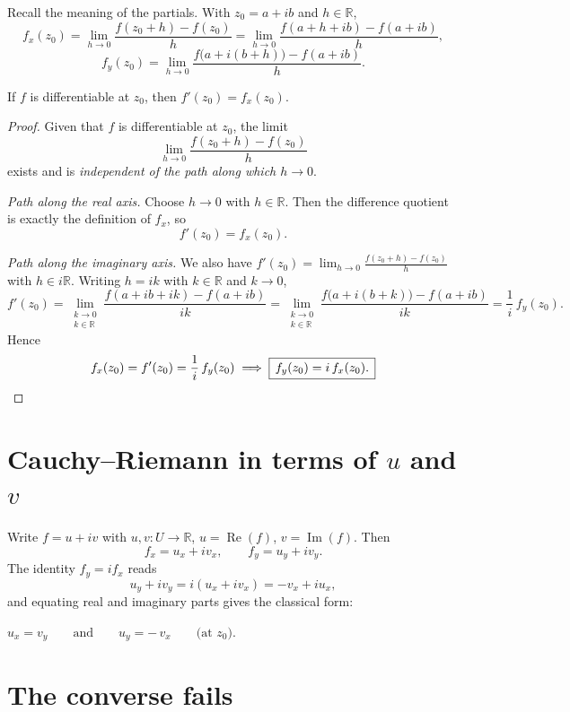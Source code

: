 \documentclass[11pt,openany]{report}
\newcommand{\R}{\mathbb{R}}
\renewcommand{\Re}{\operatorname{Re}}
\renewcommand{\Im}{\operatorname{Im}}
\begin{document}
Recall the meaning of the partials. With $z_0=a+ib$ and $h\in\R$,
\[
  f_x(z_0) = \lim_{h\to0}\frac{f(z_0+h)-f(z_0)}{h}
           = \lim_{h\to0}\frac{f(a+h+ib)-f(a+ib)}{h},
\]
\[
  f_y(z_0) = \lim_{h\to0}\frac{f\bigl(a+i(b+h)\bigr)-f(a+ib)}{h}.
\]

\begin{remark}
If $f$ is differentiable at $z_0$, then $f'(z_0)=f_x(z_0)$.
\end{remark}

\begin{proof}
Given that $f$ is differentiable at $z_0$, the limit
\[
  \lim_{h\to0}\frac{f(z_0+h)-f(z_0)}{h}
\]
exists and is \emph{independent of the path along which $h\to0$}.

\emph{Path along the real axis.} Choose $h\to0$ with $h\in\R$. Then the difference
quotient is exactly the definition of $f_x$, so
\[
  f'(z_0) = f_x(z_0).
\]

\emph{Path along the imaginary axis.} We also have
$f'(z_0)=\lim_{h\to0}\frac{f(z_0+h)-f(z_0)}{h}$ with $h\in i\R$. Writing $h=ik$ with
$k\in\R$ and $k\to0$,
\[
  f'(z_0) = \lim_{\substack{k\to0\\ k\in\R}} \frac{f(a+ib+ik)-f(a+ib)}{ik}
          = \lim_{\substack{k\to0\\ k\in\R}} \frac{f\bigl(a+i(b+k)\bigr)-f(a+ib)}{ik}
          = \frac1i\,f_y(z_0).
\]
Hence
\[
  f_x(z_0) = f'(z_0) = \frac1i\,f_y(z_0)
  \;\Longrightarrow\; \boxed{\,f_y(z_0) = i\,f_x(z_0).\,}\qedhere
\]
\end{proof}

\section{Cauchy--Riemann in terms of \texorpdfstring{$u$}{u} and \texorpdfstring{$v$}{v}}

Write $f=u+iv$ with $u,v:U\to\R$, $u=\Re(f)$, $v=\Im(f)$. Then
\[
  f_x = u_x + i v_x, \qquad f_y = u_y + i v_y .
\]
The identity $f_y=i f_x$ reads
\[
  u_y + i v_y = i(u_x + i v_x) = -v_x + i u_x,
\]
and equating real and imaginary parts gives the classical form:
\begin{keybox}
\centering
$u_x = v_y \qquad\text{and}\qquad u_y = -\,v_x \qquad\text{(at } z_0).$
\end{keybox}

\section{The converse fails}
\end{document}
